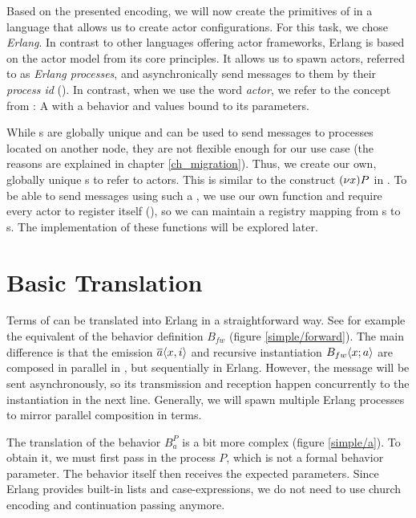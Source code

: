 Based on the presented encoding,
we will now create the primitives of \corejoincalc
in a language that allows us to create actor configurations.
For this task, we chose \emph{Erlang}.
In contrast to other languages offering actor frameworks,
Erlang is based on the actor model from its core principles.
It allows us to spawn actors, referred to as \emph{Erlang processes},
and asynchronically send messages to them by their \emph{process id} (\PID).
In contrast, when we use the word \emph{actor},
we refer to the concept from \actorpicalc:
A \actorname with a behavior and values bound to its parameters.

While \PID{}s are globally unique and can be used to send messages to
processes located on another node,
they are not flexible enough for our use case
(the reasons are explained in chapter \ref{ch_migration}).
Thus, we create our own, globally unique \actorname{}s to refer to actors.
This is similar to the construct $\anew{x}{P}$ in \actorpicalc.
To be able to send messages using such a \actorname,
we use our own  function and require every actor to register itself
(),
so we can maintain a registry mapping from \actorname{}s to \PID{}s.
The implementation of these functions will be explored later.


\section{Basic Translation}
\label{implementation_basic}

Terms of \actorpicalc can be translated into Erlang in a straightforward way.
See for example the equivalent of the behavior definition $B_{fw}$
(figure \ref{simple/forward}).
The main difference is that the emission $\overline{a}\langle x,i\rangle$
and recursive instantiation $B_{fw} \langle x ; a \rangle$
are composed in parallel in \actorpicalc,
but sequentially in Erlang.
However, the message will be sent asynchronously,
so its transmission and reception happen concurrently to the instantiation
in the next line.
Generally, we will spawn multiple Erlang processes to
mirror parallel composition in \actorpicalc terms.


The translation of the behavior $B_a^P$ is a bit more complex
(figure \ref{simple/a}).
To obtain it, we must first pass in the process $P$,
which is not a formal behavior parameter.
The behavior itself then receives the expected parameters.
Since Erlang provides built-in lists and case-expressions,
we do not need to use church encoding and continuation passing anymore.

